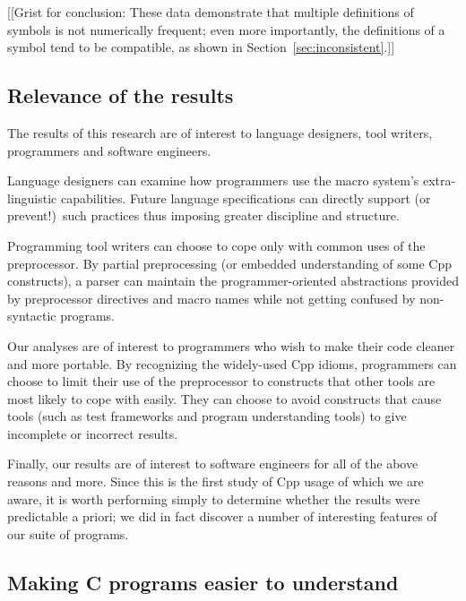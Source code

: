 \documentclass[10pt]{article}
\begin{document}
[[Grist for conclusion: These data demonstrate that multiple definitions of
symbols is not numerically frequent; even more importantly, the definitions
of a symbol tend to be compatible, as shown in
Section~\ref{sec:inconsistent}.]]


\subsection{Relevance of the results}

The results of this research are of interest to language designers, tool
writers, programmers and software engineers.

Language designers can examine how programmers use the macro system's
extra-linguistic capabilities.  Future language specifications can
directly support (or prevent!)\ such practices thus imposing greater
discipline and structure.


Programming tool writers can choose to cope only with common uses of the
preprocessor.  By partial preprocessing (or embedded understanding of
some Cpp constructs), a parser can maintain the
programmer-oriented abstractions provided by preprocessor directives and
macro names while not getting confused by non-syntactic programs.

Our analyses are of interest to programmers who wish to make their code
cleaner and more portable.  By recognizing the widely-used Cpp idioms,
programmers can choose to limit their use of the preprocessor to
constructs that other tools are most likely to cope with easily.  They
can choose to avoid constructs that cause tools (such as test frameworks
and program understanding tools) to give incomplete or incorrect
results.


Finally, our results are of interest to software engineers for all of the
above reasons and more.  Since this is the first study of Cpp usage of which
we are aware, it is worth performing simply to determine whether the
results were predictable a priori; we did in fact discover a number of
interesting features of our suite of programs.


\subsection{Making C programs easier to understand}
\end{document}
